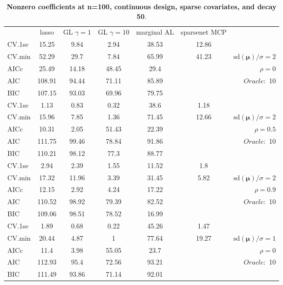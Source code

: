 \clearpage
\begin{table}\vspace{-.5cm}
\caption[l]{ { \bf Nonzero coefficients at n=100, continuous design, 
sparse covariates, and  decay  50}.}
\vspace{-.5cm}
\footnotesize{}
\begin{center}
\begin{tabular}{l*{5}{c}|r}
& lasso & GL $\gamma=1$ & GL $\gamma=10$ & marginal AL & sparsenet MCP  & \\
 \cline{1-7}
CV.1se & 15.25 & 9.84 & 2.94 & 38.53 & 12.86 & \\
CV.min & 52.29 & 29.7 & 7.84 & 65.99 & 41.23 &  $\mathrm{sd}(\mathbf{\mu})/\sigma=2$ \\
AICc & 25.49 & 14.18 & 48.45 & 29.4 & & $\rho=0$ \\
AIC & 108.91 & 94.44 & 71.11 & 85.89 & &  \multirow{2}{*}{$Oracle: $ 10} \\
BIC & 107.15 & 93.03 & 69.96 & 79.75 & &  \\
 \hline 
CV.1se & 1.13 & 0.83 & 0.32 & 38.6 & 1.18 & \\
CV.min & 15.96 & 7.85 & 1.36 & 71.45 & 12.66 &  $\mathrm{sd}(\mathbf{\mu})/\sigma=2$ \\
AICc & 10.31 & 2.05 & 51.43 & 22.39 & & $\rho=0.5$ \\
AIC & 111.75 & 99.46 & 78.84 & 91.86 & &  \multirow{2}{*}{$Oracle: $ 10} \\
BIC & 110.21 & 98.12 & 77.3 & 88.77 & &  \\
 \hline 
CV.1se & 2.94 & 2.39 & 1.55 & 11.52 & 1.8 & \\
CV.min & 17.32 & 11.96 & 3.39 & 31.45 & 5.82 &  $\mathrm{sd}(\mathbf{\mu})/\sigma=2$ \\
AICc & 12.15 & 2.92 & 4.24 & 17.22 & & $\rho=0.9$ \\
AIC & 110.52 & 98.92 & 79.39 & 82.52 & &  \multirow{2}{*}{$Oracle: $ 10} \\
BIC & 109.06 & 98.51 & 78.52 & 16.99 & &  \\
 \hline 
CV.1se & 1.89 & 0.68 & 0.22 & 45.26 & 1.47 & \\
CV.min & 20.44 & 4.87 & 1 & 77.64 & 19.27 &  $\mathrm{sd}(\mathbf{\mu})/\sigma=1$ \\
AICc & 11.4 & 3.98 & 55.05 & 23.7 & & $\rho=0$ \\
AIC & 112.93 & 95.4 & 72.56 & 93.21 & &  \multirow{2}{*}{$Oracle: $ 10} \\
BIC & 111.49 & 93.86 & 71.14 & 92.01 & &  \\

\end{tabular}
\end{center}
\end{table}
